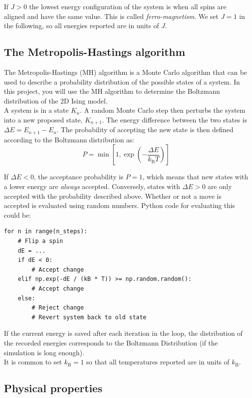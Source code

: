 \documentclass{article}
\begin{document}
If $J > 0$ the lowest energy configuration of the system is when all spins are aligned and have the same value.
This is called \textit{ferro-magnetism}.
We set $J = 1$ in the following, so all energies reported are in units of $J$.

\subsection{The Metropolis-Hastings algorithm}

The Metropolis-Hastings (MH) algorithm is a Monte Carlo algorithm that can be used to describe a probability distribution of the possible states of a system.
In this project, you will use the MH algorithm to determine the Boltzmann distribution of the 2D Ising model.\\

A system is in a state $K_n$.
A random Monte Carlo step then perturbs the system into a new proposed state, $K_{n+1}$.
The energy difference between the two states is $\Delta E = E_{n+1} - E_n$.
The probability of accepting the new state is then defined according to the Boltzmann distribution as:
\begin{equation}
P = \min \left[1, \exp \left(-\frac{\Delta E}{k_{\mathrm{B}}T}\right) \right]
\end{equation} 

If $\Delta E < 0$, the acceptance probability is $P = 1$, which means that new states with a lower energy are \textit{always} accepted.
Conversely, states with $\Delta E > 0 $ are only accepted with the probability described above.
Whether or not a move is accepted is evaluated using random numbers.
Python code for evaluating this could be:
\begin{lstlisting}
for n in range(n_steps):
    # Flip a spin
    dE = ...
    if dE < 0:
        # Accept change
    elif np.exp(-dE / (kB * T)) >= np.random.random():
        # Accept change
    else:
        # Reject change
        # Revert system back to old state
\end{lstlisting}

If the current energy is saved after each iteration in the loop, the distribution of the recorded energies corresponds to the Boltzmann Distribution (if the simulation is long enough).\\

It is common to set $k_{\mathrm{B}} = 1$ so that all temperatures reported are in units of $k_{\mathrm{B}}$.

\newpage
\subsection{Physical properties}
\end{document}
